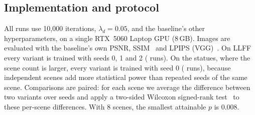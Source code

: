 \subsection{Implementation and protocol}
All runs use 10{,}000 iterations, $\lambda_d = 0.05$, and the baseline's other hyperparameters, on a single RTX~5060 Laptop GPU (8\,GB). Images are evaluated with the baseline's own PSNR, SSIM~\cite{ssim} and LPIPS (VGG)~\cite{lpips}. On LLFF every variant is trained with seeds 0, 1 and 2 (\LLFFnruns{} runs). On the statues, where the scene count is larger, every variant is trained with seed 0 (\Statuesnruns{} runs), because independent scenes add more statistical power than repeated seeds of the same scene. Comparisons are paired: for each scene we average the difference between two variants over seeds and apply a two-sided Wilcoxon signed-rank test~\cite{wilcoxon} to these per-scene differences. With 8 scenes, the smallest attainable $p$ is 0.008.


